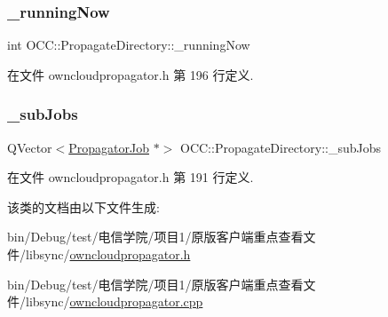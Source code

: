 \subsubsection{\texorpdfstring{\+\_\+running\+Now}{\_runningNow}}
{\footnotesize\ttfamily int O\+C\+C\+::\+Propagate\+Directory\+::\+\_\+running\+Now}



在文件 owncloudpropagator.\+h 第 196 行定义.

\mbox{\label{class_o_c_c_1_1_propagate_directory_a66a9b54963f22dae1093fcaa4329f6fb}} 
\subsubsection{\texorpdfstring{\+\_\+sub\+Jobs}{\_subJobs}}
{\footnotesize\ttfamily Q\+Vector$<$\hyperlink{class_o_c_c_1_1_propagator_job}{Propagator\+Job} $\ast$$>$ O\+C\+C\+::\+Propagate\+Directory\+::\+\_\+sub\+Jobs}



在文件 owncloudpropagator.\+h 第 191 行定义.



该类的文档由以下文件生成\+:\begin{DoxyCompactItemize}
\item 
bin/\+Debug/test/电信学院/项目1/原版客户端重点查看文件/libsync/\hyperlink{owncloudpropagator_8h}{owncloudpropagator.\+h}\item 
bin/\+Debug/test/电信学院/项目1/原版客户端重点查看文件/libsync/\hyperlink{owncloudpropagator_8cpp}{owncloudpropagator.\+cpp}\end{DoxyCompactItemize}
